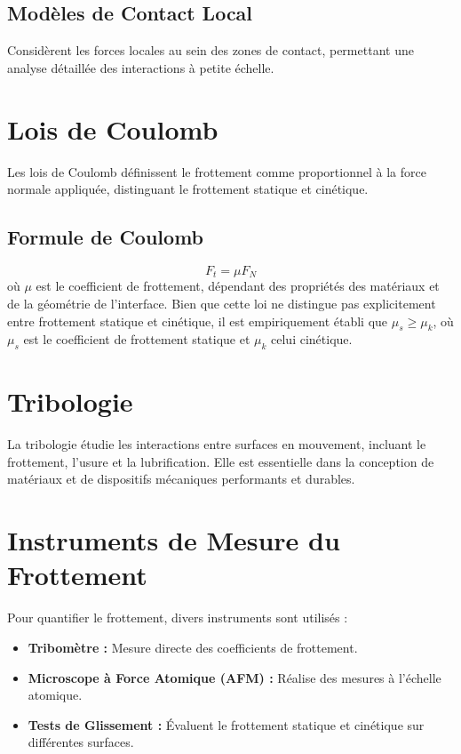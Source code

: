 \subsection{Modèles de Contact Local}
Considèrent les forces locales au sein des zones de contact, permettant une analyse détaillée des interactions à petite échelle.

\section{Lois de Coulomb}

Les lois de Coulomb définissent le frottement comme proportionnel à la force normale appliquée, distinguant le frottement statique et cinétique.

\subsection{Formule de Coulomb}
\begin{equation}
F_t = \mu F_N \label{eq:coulomb}
\end{equation}
où \(\mu\) est le coefficient de frottement, dépendant des propriétés des matériaux et de la géométrie de l'interface. Bien que cette loi ne distingue pas explicitement entre frottement statique et cinétique, il est empiriquement établi que \(\mu_s \geq \mu_k\), où \(\mu_s\) est le coefficient de frottement statique et \(\mu_k\) celui cinétique.

\section{Tribologie}

La tribologie étudie les interactions entre surfaces en mouvement, incluant le frottement, l'usure et la lubrification. Elle est essentielle dans la conception de matériaux et de dispositifs mécaniques performants et durables.

\section{Instruments de Mesure du Frottement}

Pour quantifier le frottement, divers instruments sont utilisés :
\begin{itemize}
    \item \textbf{Tribomètre :} Mesure directe des coefficients de frottement.
    \item \textbf{Microscope à Force Atomique (AFM) :} Réalise des mesures à l'échelle atomique.
    \item \textbf{Tests de Glissement :} Évaluent le frottement statique et cinétique sur différentes surfaces.
\end{itemize}


